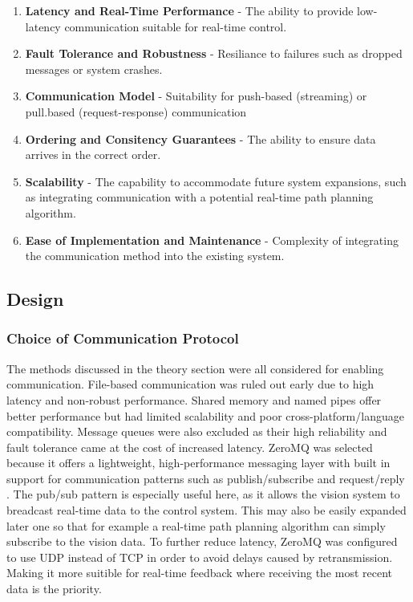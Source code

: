 \begin{enumerate}
    \item \textbf{Latency and Real-Time Performance} - The ability to provide low-latency communication suitable for real-time control.
    \item \textbf{Fault Tolerance and Robustness} - Resiliance to failures such as dropped messages or system crashes.
    \item \textbf{Communication Model} - Suitability for push-based (streaming) or pull.based (request-response) communication
    \item \textbf{Ordering and Consitency Guarantees} - The ability to ensure data arrives in the correct order.
    \item \textbf{Scalability} - The capability to accommodate future system expansions, such as integrating communication with a potential real-time path planning algorithm.
    \item \textbf{Ease of Implementation and Maintenance} - Complexity of integrating the communication method into the existing system.
\end{enumerate}




\subsection{Design}
\subsubsection{Choice of Communication Protocol}
The methods discussed in the theory section were all considered for enabling communication. File-based communication was ruled out early due to high latency and non-robust performance. Shared memory and named pipes offer better performance but had limited scalability and poor cross-platform/language compatibility. Message queues were also excluded as their high reliability and fault tolerance came at the cost of increased latency.
\newline \newline 
ZeroMQ was selected because it offers a lightweight, high-performance messaging layer with built in support for communication patterns such as publish/subscribe and request/reply \cite{lauener_how_2018}. The pub/sub pattern is especially useful here, as it allows the vision system to breadcast real-time data to the control system. This may also be easily expanded later one so that for example a real-time path planning algorithm can simply subscribe to the vision data.
\newline \newline
To further reduce latency, ZeroMQ was configured to use UDP instead of TCP in order to avoid delays caused by retransmission. Making it more suitible for real-time feedback where receiving the most recent data is the priority. 



